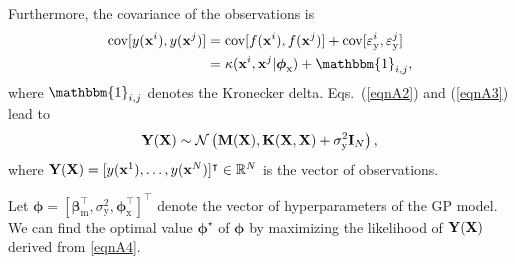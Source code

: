 \documentclass[iicol,sn-basic]{sn-jnl}%
\begin{document}
\begin{appendices}
Furthermore, the covariance of the observations is
\begin{equation}\label{eqnA3}
	\begin{aligned}
		\text{cov}[y({\bf x}^i),y({\bf x}^j)] & = \text{cov}[f({\bf x}^i),f({\bf x}^j)] + \text{cov}[\varepsilon_\text{y}^i,\varepsilon_\text{y}^j]\\
		& = \kappa({\bf x}^i,{\bf x}^j|\boldsymbol \phi_{\text{x}}) + \mathbbm{1}_{i,j},
	\end{aligned}
\end{equation}
where $\mathbbm{1}_{i,j}$ denotes the Kronecker delta. Eqs.~(\ref{eqnA2}) and (\ref{eqnA3}) lead to
\begin{equation}\label{eqnA4}
	{\bf Y}({\bf X}) \sim \mathcal{N} \left({\bf M}({\bf X}),{\bf K}({\bf X},{\bf X})+\sigma^2_\text{y} {\bf I}_N\right),
\end{equation}
where ${\bf Y}({\bf X})=[y({\bf x}^1),\dots,y({\bf x}^N)]^\intercal \in \mathbb{R}^N$ is the vector of observations.

Let ${\boldsymbol \phi} = [\boldsymbol \beta_{\text{m}}^\intercal,\sigma^2_\text{y},\boldsymbol \phi_{\text{x}}^\intercal]^\intercal$ denote the vector of hyperparameters of the GP model.
We can find the optimal value ${\boldsymbol \phi^\star}$ of ${\boldsymbol \phi}$ by maximizing the likelihood of ${\bf Y}({\bf X})$ derived from \cref{eqnA4}.


\end{appendices}
\end{document}
